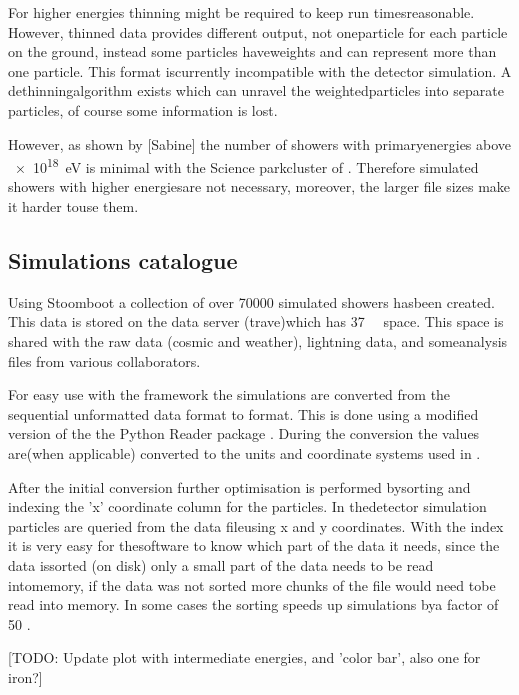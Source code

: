 For higher energies thinning might be required to keep run timesreasonable. However, thinned data provides different output, not oneparticle for each particle on the ground, instead some particles haveweights and can represent more than one particle. This format iscurrently incompatible with the detector simulation. A dethinningalgorithm exists \cite{stokes2012} which can unravel the weightedparticles into separate particles, of course some information is lost.

However, as shown by [Sabine] the number of showers with primaryenergies above \SI{e18}{\eV} is minimal with the Science parkcluster of \hisparc. Therefore simulated showers with higher energiesare not necessary, moreover, the larger file sizes make it harder touse them.


\subsection{Simulations catalogue}

Using Stoomboot a collection of over \num{70000} simulated showers hasbeen created. This data is stored on the \hisparc data server (trave)which has \SI{37}{\tera\byte} space. This space is shared with the raw \hisparc data (cosmic and weather), \knmi lightning data, and someanalysis files from various \hisparc collaborators.

For easy use with the \sapphire framework the \corsika simulations are converted from the sequential unformatted \fortran data format to \hdf format. This is done using a modified version of the the Python \corsika Reader package \cite{gonzalez2011}. During the conversion the values are(when applicable) converted to the units and coordinate systems used in .

After the initial conversion further optimisation is performed bysorting and indexing the 'x' coordinate column for the particles. In thedetector simulation particles are queried from the \corsika data fileusing x and y coordinates. With the index it is very easy for thesoftware to know which part of the data it needs, since the data issorted (on disk) only a small part of the data needs to be read intomemory, if the data was not sorted more chunks of the file would need tobe read into memory. In some cases the sorting speeds up simulations bya factor of 50 \cite{pytables:optimization}.

[TODO: Update plot with intermediate energies, and 'color bar', also one for iron?]


